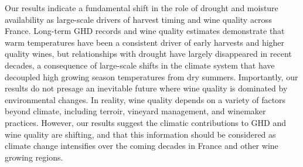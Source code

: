 \documentclass[final]{nature}
\begin{document}
\indent Our results indicate a fundamental shift in the role of drought and moisture availability as large-scale drivers of harvest timing and wine quality across France. Long-term GHD records and wine quality estimates demonstrate that warm temperatures have been a consistent driver of early harvests and higher quality wines, but relationships with drought have largely disappeared in recent decades, a consequence of large-scale shifts in the climate system that have decoupled high growing season temperatures from dry summers. Importantly, our results do not presage an inevitable future where wine quality is dominated by environmental changes. In reality, wine quality depends on a variety of factors beyond climate, including terroir, vineyard management, and winemaker practices. However, our results suggest the climatic contributions to GHD and wine quality are shifting, and that this information should be considered as climate change intensifies over the coming decades in France and other wine growing regions.
\end{document}
